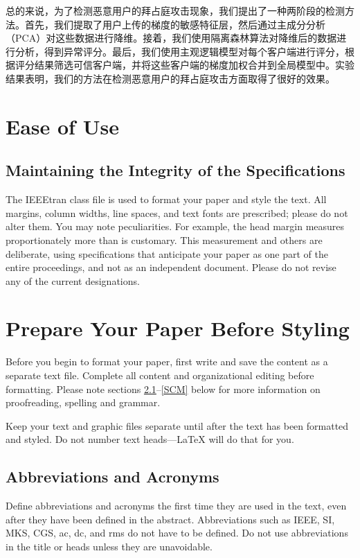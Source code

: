 \documentclass[conference]{IEEEtran}
\begin{document}
总的来说，为了检测恶意用户的拜占庭攻击现象，我们提出了一种两阶段的检测方法。首先，我们提取了用户上传的梯度的敏感特征层，然后通过主成分分析（PCA）对这些数据进行降维。接着，我们使用隔离森林算法对降维后的数据进行分析，得到异常评分。最后，我们使用主观逻辑模型对每个客户端进行评分，根据评分结果筛选可信客户端，并将这些客户端的梯度加权合并到全局模型中。实验结果表明，我们的方法在检测恶意用户的拜占庭攻击方面取得了很好的效果。

\section{Ease of Use}

\subsection{Maintaining the Integrity of the Specifications}

The IEEEtran class file is used to format your paper and style the text. All margins, 
column widths, line spaces, and text fonts are prescribed; please do not 
alter them. You may note peculiarities. For example, the head margin
measures proportionately more than is customary. This measurement 
and others are deliberate, using specifications that anticipate your paper 
as one part of the entire proceedings, and not as an independent document. 
Please do not revise any of the current designations.

\section{Prepare Your Paper Before Styling}
Before you begin to format your paper, first write and save the content as a 
separate text file. Complete all content and organizational editing before 
formatting. Please note sections \ref{AA}--\ref{SCM} below for more information on 
proofreading, spelling and grammar.

Keep your text and graphic files separate until after the text has been 
formatted and styled. Do not number text heads---{\LaTeX} will do that 
for you.

\subsection{Abbreviations and Acronyms}\label{AA}
Define abbreviations and acronyms the first time they are used in the text, 
even after they have been defined in the abstract. Abbreviations such as 
IEEE, SI, MKS, CGS, ac, dc, and rms do not have to be defined. Do not use 
abbreviations in the title or heads unless they are unavoidable.
\end{document}
